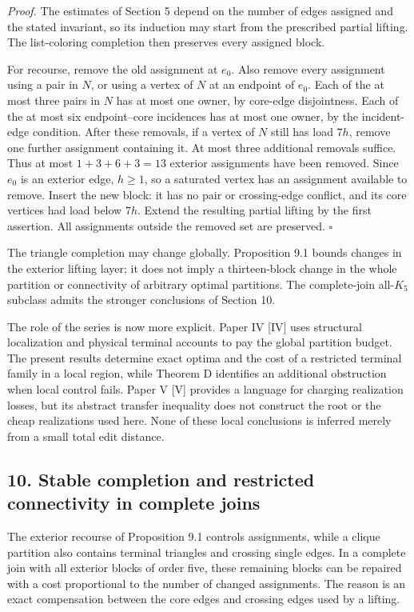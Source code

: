 \documentclass[english,11pt,a4paper]{article}
\begin{document}
\emph{Proof.} The estimates of Section 5 depend on the number of edges
assigned and the stated invariant, so its induction may start from the
prescribed partial lifting. The list-coloring completion then preserves
every assigned block.

For recourse, remove the old assignment at \(e_0\). Also remove every
assignment using a pair in \(N\), or using a vertex of \(N\) at an
endpoint of \(e_0\). Each of the at most three pairs in \(N\) has at
most one owner, by core-edge disjointness. Each of the at most six
endpoint--core incidences has at most one owner, by the incident-edge
condition. After these removals, if a vertex of \(N\) still has load
\(7h\), remove one further assignment containing it. At most three
additional removals suffice. Thus at most \(1+3+6+3=13\) exterior
assignments have been removed. Since \(e_0\) is an exterior edge,
\(h\ge1\), so a saturated vertex has an assignment available to remove.
Insert the new block: it has no pair or crossing-edge conflict, and its
core vertices had load below \(7h\). Extend the resulting partial
lifting by the first assertion. All assignments outside the removed set
are preserved. \(\square\)

The triangle completion may change globally. Proposition 9.1 bounds
changes in the exterior lifting layer; it does not imply a
thirteen-block change in the whole partition or connectivity of
arbitrary optimal partitions. The complete-join all-\(K_5\) subclass
admits the stronger conclusions of Section 10.

The role of the series is now more explicit. Paper IV {[}IV{]} uses
structural localization and physical terminal accounts to pay the global
partition budget. The present results determine exact optima and the
cost of a restricted terminal family in a local region, while Theorem D
identifies an additional obstruction when local control fails. Paper V
{[}V{]} provides a language for charging realization losses, but its
abstract transfer inequality does not construct the root or the cheap
realizations used here. None of these local conclusions is inferred
merely from a small total edit distance.

\subsection{10. Stable completion and restricted connectivity in
complete
joins}\label{stable-completion-and-restricted-connectivity-in-complete-joins}

The exterior recourse of Proposition 9.1 controls assignments, while a
clique partition also contains terminal triangles and crossing single
edges. In a complete join with all exterior blocks of order five, these
remaining blocks can be repaired with a cost proportional to the number
of changed assignments. The reason is an exact compensation between the
core edges and crossing edges used by a lifting.
\end{document}

